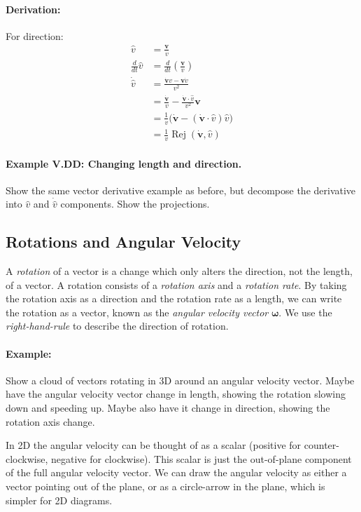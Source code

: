 \documentclass{article}
\renewcommand{\vec}[1]{\boldsymbol{#1}}
\begin{document}
\paragraph{Derivation:}
For direction:
\begin{align}
  \hat{v} &= \frac{\vec{v}}{v} \\
  \frac{d}{dt} \hat{v} &= \frac{d}{dt}\left(\frac{\vec{v}}{v}\right) \\
  \dot{\hat{v}} &= \frac{\dot{\vec{v}} v - \vec{v} \dot{v}}{v^2} \\
  &= \frac{\dot{\vec{v}}}{v}
  - \frac{\dot{\vec{v}} \cdot \hat{v}}{v^2} \vec{v} \\
  &= \frac{1}{v} \big( \dot{\vec{v}}
  - (\dot{\vec{v}} \cdot \hat{v}) \hat{v} \big)\\
  &= \frac{1}{v} \operatorname{Rej}(\dot{\vec{v}}, \hat{v})
\end{align}

\paragraph{Example V.DD: Changing length and direction.} Show the same
vector derivative example as before, but decompose the derivative into
$\hat{v}$ and $\dot{\hat{v}}$ components. Show the projections.

\subsection{Rotations and Angular Velocity}

A \emph{rotation} of a vector is a change which only alters the
direction, not the length, of a vector. A rotation consists of a
\emph{rotation axis} and a \emph{rotation rate}. By taking the
rotation axis as a direction and the rotation rate as a length, we can
write the rotation as a vector, known as the \emph{angular velocity
  vector} $\vec{\omega}$. We use the \emph{right-hand-rule} to
describe the direction of rotation.

\paragraph{Example:} Show a cloud of vectors rotating in 3D around an
angular velocity vector. Maybe have the angular velocity vector change
in length, showing the rotation slowing down and speeding up. Maybe
also have it change in direction, showing the rotation axis change.

In 2D the angular velocity can be thought of as a scalar (positive for
counter-clockwise, negative for clockwise). This scalar is just the
out-of-plane component of the full angular velocity vector. We can
draw the angular velocity as either a vector pointing out of the
plane, or as a circle-arrow in the plane, which is simpler for 2D
diagrams.
\end{document}
